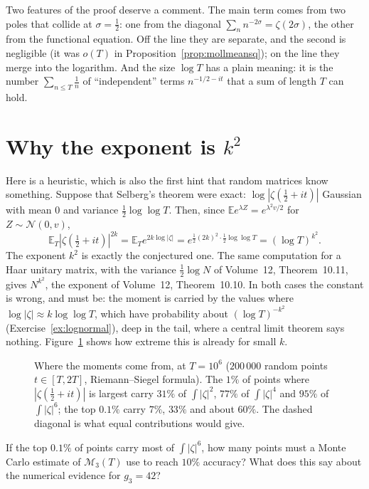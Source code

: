 Two features of the proof deserve a comment. The main term comes from two poles that collide at $\sigma=\frac12$: one from the diagonal $\sum_nn^{-2\sigma}=\zeta(2\sigma)$, the other from the functional equation. Off the line they are separate, and the second is negligible (it was $o(T)$ in Proposition~\ref{prop:mollmeansq}); on the line they merge into the logarithm. And the size $\log T$ has a plain meaning: it is the number $\sum_{n\le T}\frac1n$ of ``independent'' terms $n^{-1/2-it}$ that a sum of length $T$ can hold.

\section{Why the exponent is \texorpdfstring{$k^2$}{k squared}}

Here is a heuristic, which is also the first hint that random matrices know something. Suppose that Selberg's theorem were exact: $\log|\zeta(\frac12+it)|$ Gaussian with mean $0$ and variance $\frac12\log\log T$. Then, since $\mathbb Ee^{\lambda Z}=e^{\lambda^2v/2}$ for $Z\sim\mathcal N(0,v)$,
\[
\mathbb E_T|\zeta(\tfrac12+it)|^{2k}=\mathbb E_Te^{2k\log|\zeta|}=e^{\frac12(2k)^2\cdot\frac12\log\log T}=(\log T)^{k^2}.
\]
The exponent $k^2$ is exactly the conjectured one. The same computation for a Haar unitary matrix, with the variance $\frac12\log N$ of Volume~12, Theorem~10.11, gives $N^{k^2}$, the exponent of Volume~12, Theorem~10.10. In both cases the constant is wrong, and must be: the moment is carried by the values where $\log|\zeta|\approx k\log\log T$, which have probability about $(\log T)^{-k^2}$ (Exercise~\ref{ex:lognormal}), deep in the tail, where a central limit theorem says nothing. Figure~\ref{fig:momentshare} shows how extreme this is already for small $k$.

\begin{figure}[ht]
\centering{}
\caption{Where the moments come from, at $T=10^6$ ($200\,000$ random points $t\in[T,2T]$, Riemann--Siegel formula). The $1\%$ of points where $|\zeta(\frac12+it)|$ is largest carry $31\%$ of $\int|\zeta|^2$, $77\%$ of $\int|\zeta|^4$ and $95\%$ of $\int|\zeta|^6$; the top $0.1\%$ carry $7\%$, $33\%$ and about $60\%$. The dashed diagonal is what equal contributions would give.}
\label{fig:momentshare}
\end{figure}

\begin{think}
If the top $0.1\%$ of points carry most of $\int|\zeta|^6$, how many points must a Monte Carlo estimate of $\mathcal M_3(T)$ use to reach $10\%$ accuracy? What does this say about the numerical evidence for $g_3=42$?
\end{think}

